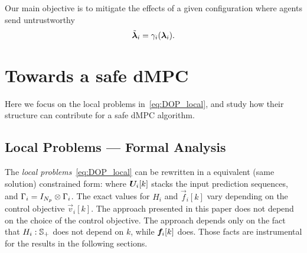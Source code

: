 \documentclass{ifacconf}  %
\begin{document}
Our main objective is to mitigate the effects of a given configuration where agents send untrustworthy
\begin{equation*}
\tilde{\boldsymbol{\lambda}}_i=\gamma_{i}(\boldsymbol{\lambda}_i).
\end{equation*}

\section{Towards a safe dMPC}\label{sec:TSM}

Here we focus on the local problems in~\eqref{eq:DOP_local}, and study how their structure can contribute for a safe dMPC algorithm.

\subsection{Local Problems --- Formal Analysis}\label{ssec:FA}

The \emph{local problems}~\eqref{eq:DOP_local} can be rewritten in a equivalent (same solution) constrained \qp{} form:
where ${\Uik}$ stacks the input prediction sequences, and
${\relax{\Gamma}_{i}=I_{N_{p}}\mathbin{\otimes}\Gamma_{i}}$.
The exact values for $H_{i}$ and $\vec{f}_{i}[k]$ vary depending on the control objective $\vec{v}_{i}[k]$. The approach presented in this paper does not depend on the choice of the control objective.
The approach depends only on the fact that $H_{i}:\mathbb{S}_{+}$ does not depend on $k$, while $\fik$ does. Those facts are instrumental for the results in the following sections.
\end{document}
